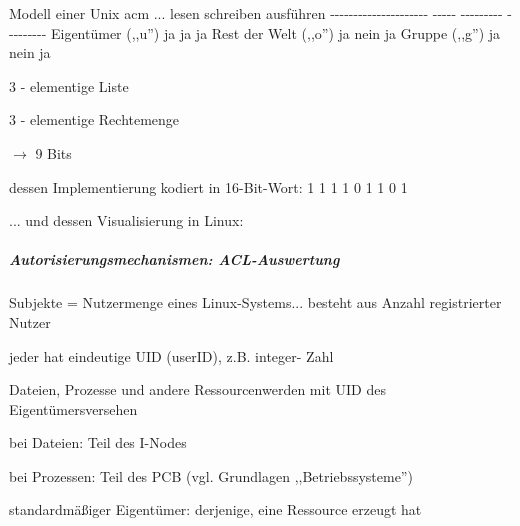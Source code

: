 \documentclass[a4paper]{article}
\begin{document}
\begin{multicols}{3}
    Modell einer Unix acm ... \textbar{} \textbar{} lesen \textbar{}
    schreiben \textbar{} ausführen \textbar{} \textbar{}
    -\/-\/-\/-\/-\/-\/-\/-\/-\/-\/-\/-\/-\/-\/-\/-\/-\/-\/-\/-\/- \textbar{}
    -\/-\/-\/-\/- \textbar{} -\/-\/-\/-\/-\/-\/-\/-\/- \textbar{}
    -\/-\/-\/-\/-\/-\/-\/-\/- \textbar{} \textbar{} Eigentümer (,,u'')
    \textbar{} ja \textbar{} ja \textbar{} ja \textbar{} \textbar{} Rest der
    Welt (,,o'') \textbar{} ja \textbar{} nein \textbar{} ja \textbar{}
    \textbar{} Gruppe (,,g'') \textbar{} ja \textbar{} nein \textbar{} ja
    \textbar{}

    \begin{itemize*}
        \item
        3 - elementige Liste
        \item
        3 - elementige Rechtemenge
        \item
        $\rightarrow$ 9 Bits
        \item
        dessen Implementierung kodiert in 16-Bit-Wort: 1 1 1 1 0 1 1 0 1
        \item
        ... und dessen Visualisierung in Linux:
    \end{itemize*}



    \subparagraph{Autorisierungsmechanismen:
        ACL-Auswertung}

    Subjekte = Nutzermenge eines Linux-Systems... besteht aus Anzahl
    registrierter Nutzer

    \begin{itemize*}
        \item
        jeder hat eindeutige UID (userID), z.B. integer- Zahl
        \item
        Dateien, Prozesse und andere Ressourcenwerden mit UID des
        Eigentümersversehen
        \begin{itemize*}
            \item bei Dateien: Teil des I-Nodes
            \item bei Prozessen: Teil des PCB (vgl. Grundlagen ,,Betriebssysteme'')
            \item standardmäßiger Eigentümer: derjenige, eine Ressource erzeugt hat
        \end{itemize*}
    \end{itemize*}


\end{multicols}
\end{document}
